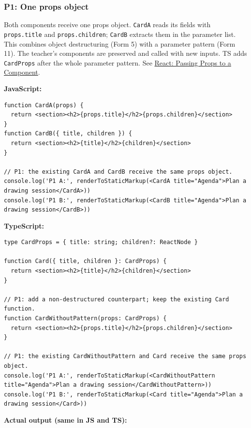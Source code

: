 \documentclass[
  11pt,
]{article}
\newcommand{\passthrough}[1]{#1}
\begin{document}
\subsubsection{P1: One props object}\label{p1-one-props-object}

Both components receive one props object.
\passthrough{\lstinline!CardA!} reads its fields with
\passthrough{\lstinline!props.title!} and
\passthrough{\lstinline!props.children!};
\passthrough{\lstinline!CardB!} extracts them in the parameter list.
This combines object destructuring (Form 5) with a parameter pattern
(Form 11). The teacher's components are preserved and called with new
inputs. TS adds \passthrough{\lstinline!CardProps!} after the whole
parameter pattern. See
\href{https://react.dev/learn/passing-props-to-a-component}{React:
Passing Props to a Component}.

\textbf{JavaScript:}

\begin{lstlisting}
function CardA(props) {
  return <section><h2>{props.title}</h2>{props.children}</section>
}
function CardB({ title, children }) {
  return <section><h2>{title}</h2>{children}</section>
}

// P1: the existing CardA and CardB receive the same props object.
console.log('P1 A:', renderToStaticMarkup(<CardA title="Agenda">Plan a drawing session</CardA>))
console.log('P1 B:', renderToStaticMarkup(<CardB title="Agenda">Plan a drawing session</CardB>))
\end{lstlisting}

\textbf{TypeScript:}

\begin{lstlisting}
type CardProps = { title: string; children?: ReactNode }

function Card({ title, children }: CardProps) {
  return <section><h2>{title}</h2>{children}</section>
}

// P1: add a non-destructured counterpart; keep the existing Card function.
function CardWithoutPattern(props: CardProps) {
  return <section><h2>{props.title}</h2>{props.children}</section>
}

// P1: the existing CardWithoutPattern and Card receive the same props object.
console.log('P1 A:', renderToStaticMarkup(<CardWithoutPattern title="Agenda">Plan a drawing session</CardWithoutPattern>))
console.log('P1 B:', renderToStaticMarkup(<Card title="Agenda">Plan a drawing session</Card>))
\end{lstlisting}

\textbf{Actual output (same in JS and TS):}
\end{document}
